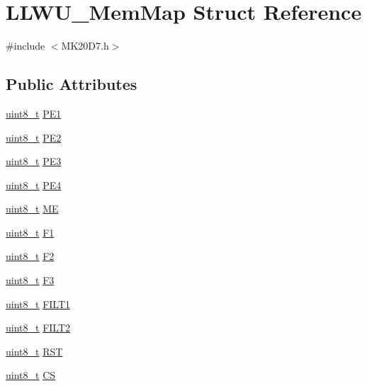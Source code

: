 \hypertarget{struct_l_l_w_u___mem_map}{}\section{L\+L\+W\+U\+\_\+\+Mem\+Map Struct Reference}
\label{struct_l_l_w_u___mem_map}


{\ttfamily \#include $<$M\+K20\+D7.\+h$>$}

\subsection*{Public Attributes}
\begin{DoxyCompactItemize}
\item 
\hyperlink{_p_e___types_8h_aba7bc1797add20fe3efdf37ced1182c5}{uint8\+\_\+t} \hyperlink{struct_l_l_w_u___mem_map_abb0c4dd1142a84dc991e6dda4a8381d6}{P\+E1}
\item 
\hyperlink{_p_e___types_8h_aba7bc1797add20fe3efdf37ced1182c5}{uint8\+\_\+t} \hyperlink{struct_l_l_w_u___mem_map_a53d86f5153bce17f9927472da4fade5a}{P\+E2}
\item 
\hyperlink{_p_e___types_8h_aba7bc1797add20fe3efdf37ced1182c5}{uint8\+\_\+t} \hyperlink{struct_l_l_w_u___mem_map_a96a722e1ae66ee87b88407ef622cf243}{P\+E3}
\item 
\hyperlink{_p_e___types_8h_aba7bc1797add20fe3efdf37ced1182c5}{uint8\+\_\+t} \hyperlink{struct_l_l_w_u___mem_map_a61ec3534039e161c5c71ea7f290f23d5}{P\+E4}
\item 
\hyperlink{_p_e___types_8h_aba7bc1797add20fe3efdf37ced1182c5}{uint8\+\_\+t} \hyperlink{struct_l_l_w_u___mem_map_ae8dea688fae93c1a5f9dd22b70cdc5cf}{ME}
\item 
\hyperlink{_p_e___types_8h_aba7bc1797add20fe3efdf37ced1182c5}{uint8\+\_\+t} \hyperlink{struct_l_l_w_u___mem_map_acb7ec83bb70ec1313cd2e0682b1ee75c}{F1}
\item 
\hyperlink{_p_e___types_8h_aba7bc1797add20fe3efdf37ced1182c5}{uint8\+\_\+t} \hyperlink{struct_l_l_w_u___mem_map_a108405432abc40a34ccbb2c0d7ecfdb4}{F2}
\item 
\hyperlink{_p_e___types_8h_aba7bc1797add20fe3efdf37ced1182c5}{uint8\+\_\+t} \hyperlink{struct_l_l_w_u___mem_map_a47d12785dc2fc2afa376e2398c7619f1}{F3}
\item 
\hyperlink{_p_e___types_8h_aba7bc1797add20fe3efdf37ced1182c5}{uint8\+\_\+t} \hyperlink{struct_l_l_w_u___mem_map_a80ad19326e9bf7209c71d7955e4ef044}{F\+I\+L\+T1}
\item 
\hyperlink{_p_e___types_8h_aba7bc1797add20fe3efdf37ced1182c5}{uint8\+\_\+t} \hyperlink{struct_l_l_w_u___mem_map_a84fdf2d8e40d91c4ad620512aaca152b}{F\+I\+L\+T2}
\item 
\hyperlink{_p_e___types_8h_aba7bc1797add20fe3efdf37ced1182c5}{uint8\+\_\+t} \hyperlink{struct_l_l_w_u___mem_map_a95c7e36f114e8ac7f235ad8ef335f1cf}{R\+ST}
\item 
\hyperlink{_p_e___types_8h_aba7bc1797add20fe3efdf37ced1182c5}{uint8\+\_\+t} \hyperlink{struct_l_l_w_u___mem_map_ac87c6987805ce2ffa553e315e9ac0804}{CS}
\end{DoxyCompactItemize}


